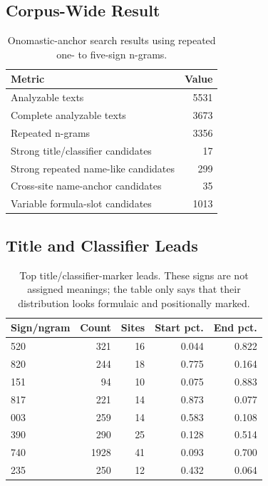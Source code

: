 \subsection{Corpus-Wide Result}

\begin{table}[htbp]
\centering
\begin{tabular}{lr}
\toprule
\textbf{Metric} & \textbf{Value} \\
\midrule
Analyzable texts & 5531 \\
Complete analyzable texts & 3673 \\
Repeated n-grams & 3356 \\
Strong title/classifier candidates & 17 \\
Strong repeated name-like candidates & 299 \\
Cross-site name-anchor candidates & 35 \\
Variable formula-slot candidates & 1013 \\
\bottomrule
\end{tabular}
\caption{Onomastic-anchor search results using repeated one- to five-sign n-grams.}
\label{tab:onomastic-summary}
\end{table}

\subsection{Title and Classifier Leads}

\begin{table}[htbp]
\centering
\begin{tabular}{lrrrr}
\toprule
\textbf{Sign/ngram} & \textbf{Count} & \textbf{Sites} & \textbf{Start pct.} & \textbf{End pct.} \\
\midrule
520 & 321 & 16 & 0.044 & 0.822 \\
820 & 244 & 18 & 0.775 & 0.164 \\
151 & 94 & 10 & 0.075 & 0.883 \\
817 & 221 & 14 & 0.873 & 0.077 \\
003 & 259 & 14 & 0.583 & 0.108 \\
390 & 290 & 25 & 0.128 & 0.514 \\
740 & 1928 & 41 & 0.093 & 0.700 \\
235 & 250 & 12 & 0.432 & 0.064 \\
\bottomrule
\end{tabular}
\caption{Top title/classifier-marker leads. These signs are not assigned meanings; the table only says that their distribution looks formulaic and positionally marked.}
\label{tab:title-classifier-leads}
\end{table}

